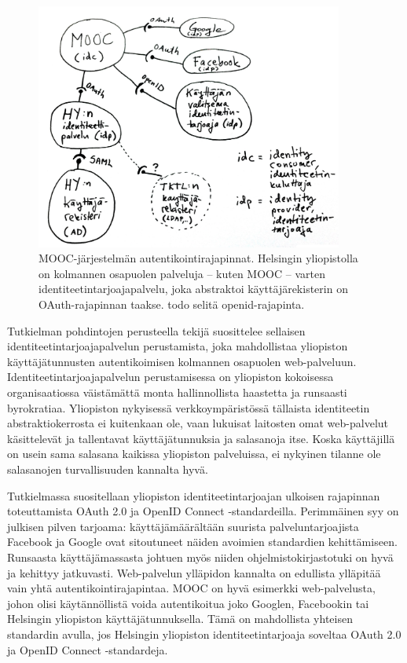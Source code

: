 \documentclass[finnish,gradu]{tktltiki}
\begin{document}
  \begin{figure}[h!]
    \centering
    \includegraphics[width=0.9\textwidth]{images/mooc_hy_idp.jpg}
    \caption{MOOC-järjestelmän autentikointirajapinnat. Helsingin yliopistolla on kolmannen osapuolen palveluja -- kuten MOOC -- varten identiteetintarjoajapalvelu, joka abstraktoi käyttäjärekisterin on OAuth-rajapinnan taakse. todo selitä openid-rajapinta.}
    \label{fig:mooc_hy_idp}
  \end{figure}

  Tutkielman pohdintojen perusteella tekijä suosittelee sellaisen identiteetintarjoajapalvelun perustamista, joka mahdollistaa yliopiston käyttäjätunnusten autentikoimisen kolmannen osapuolen web-palveluun. Identiteetintarjoajapalvelun perustamisessa on yliopiston kokoisessa organisaatiossa väistämättä monta hallinnollista haastetta ja runsaasti byrokratiaa. Yliopiston nykyisessä verkkoympäristössä tällaista identiteetin abstraktiokerrosta ei kuitenkaan ole, vaan lukuisat laitosten omat web-palvelut käsittelevät ja tallentavat käyttäjätunnuksia ja salasanoja itse. Koska käyttäjillä on usein sama salasana kaikissa yliopiston palveluissa, ei nykyinen tilanne ole salasanojen turvallisuuden kannalta hyvä.

  Tutkielmassa suositellaan yliopiston identiteetintarjoajan ulkoisen rajapinnan toteuttamista OAuth 2.0 ja OpenID Connect -standardeilla. Perimmäinen syy on julkisen pilven tarjoama: käyttäjämäärältään suurista palveluntarjoajista Facebook ja Google ovat sitoutuneet näiden avoimien standardien kehittämiseen. Runsaasta käyttäjämassasta johtuen myös niiden ohjelmistokirjastotuki on hyvä ja kehittyy jatkuvasti. Web-palvelun ylläpidon kannalta on edullista ylläpitää vain yhtä autentikointirajapintaa. MOOC on hyvä esimerkki web-palvelusta, johon olisi käytännöllistä voida autentikoitua joko Googlen, Facebookin tai Helsingin yliopiston käyttäjätunnuksella. Tämä on mahdollista yhteisen standardin avulla, jos Helsingin yliopiston identiteetintarjoaja soveltaa OAuth 2.0 ja OpenID Connect -standardeja.
\end{document}
